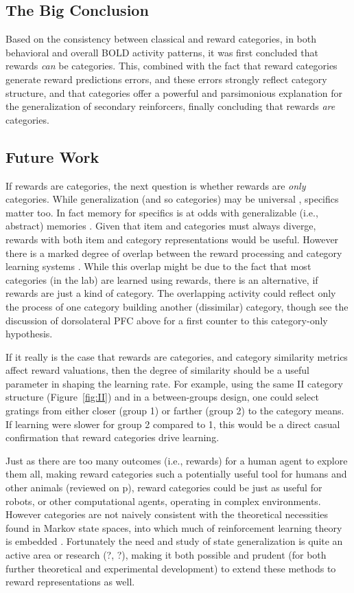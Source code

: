 \subsection{The Big Conclusion}
Based on the consistency between classical and reward categories, in both behavioral and overall BOLD activity patterns, it was first concluded that rewards \emph{can} be categories.  This, combined with the fact that reward categories generate reward predictions errors, and these errors strongly reflect category structure, and that categories offer a powerful and parsimonious explanation for the generalization of secondary reinforcers, finally concluding that rewards \emph{are} categories.


\subsection{Future Work}
\label{sub:future}
If rewards are categories, the next question is whether rewards are \emph{only} categories.  While generalization (and so categories) may be universal \cite{Shepard:1987p9102}, specifics matter too.  In fact memory for specifics is at odds with generalizable (i.e., abstract) memories \cite{Atallah:2004p5466}. Given that item and categories must always diverge, rewards with both item and category representations would be useful.  However there is a marked degree of overlap between the reward processing and category learning systems \cite{Seger:2010p7189,Ashby:2011p9148}.  While this overlap might be due to the fact that most categories (in the lab) are learned using rewards, there is an alternative, if rewards are just a kind of category.  The overlapping activity could reflect only the process of one category building another (dissimilar) category, though see the discussion of dorsolateral PFC above for a first counter to this category-only hypothesis.

If it really is the case that rewards are categories, and category similarity metrics affect reward valuations, then the degree of similarity should be a useful parameter in shaping the learning rate.  For example, using the same II category structure (Figure~\ref{fig:II}) and in a between-groups design, one could select gratings from either closer (group 1) or farther (group 2) to the category means. If learning were slower for group 2 compared to 1, this would be a direct casual confirmation that reward categories drive learning. 

Just as there are too many outcomes (i.e., rewards) for a human agent to explore them all, making reward categories such a potentially useful tool for humans and other animals (reviewed on p\pageref{sub:gen}), reward categories could be just as useful for robots, or other computational agents, operating in complex environments.   However categories are not naively consistent with the theoretical necessities found in Markov state spaces, into which much of reinforcement learning theory is embedded \cite{Sutton:1998p9247}.  Fortunately the need and study of state generalization is quite an active area or research (?, ?), making it both possible and prudent (for both further theoretical and experimental development) to extend these methods to reward representations as well. 
\clearpage